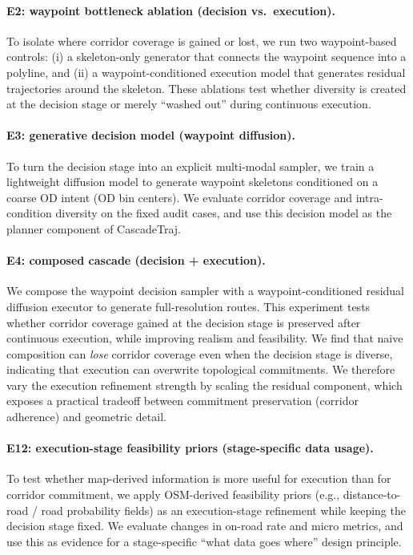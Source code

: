 \paragraph{E2: waypoint bottleneck ablation (decision vs.\ execution).}
To isolate where corridor coverage is gained or lost, we run two waypoint-based controls:
(i) a skeleton-only generator that connects the waypoint sequence into a polyline, and
(ii) a waypoint-conditioned execution model that generates residual trajectories around the skeleton.
These ablations test whether diversity is created at the decision stage or merely ``washed out'' during continuous execution.

\paragraph{E3: generative decision model (waypoint diffusion).}
To turn the decision stage into an explicit multi-modal sampler, we train a lightweight diffusion model to generate waypoint skeletons conditioned on a coarse OD intent (OD bin centers).
We evaluate corridor coverage and intra-condition diversity on the fixed audit cases, and use this decision model as the planner component of CascadeTraj.

\paragraph{E4: composed cascade (decision + execution).}
We compose the waypoint decision sampler with a waypoint-conditioned residual diffusion executor to generate full-resolution routes.
This experiment tests whether corridor coverage gained at the decision stage is preserved after continuous execution, while improving realism and feasibility.
We find that naive composition can \emph{lose} corridor coverage even when the decision stage is diverse, indicating that execution can overwrite topological commitments.
We therefore vary the execution refinement strength by scaling the residual component, which exposes a practical tradeoff between commitment preservation (corridor adherence) and geometric detail.

\paragraph{E12: execution-stage feasibility priors (stage-specific data usage).}
To test whether map-derived information is more useful for execution than for corridor commitment, we apply OSM-derived feasibility priors (e.g., distance-to-road / road probability fields) as an execution-stage refinement while keeping the decision stage fixed.
We evaluate changes in on-road rate and micro metrics, and use this as evidence for a stage-specific ``what data goes where'' design principle.

